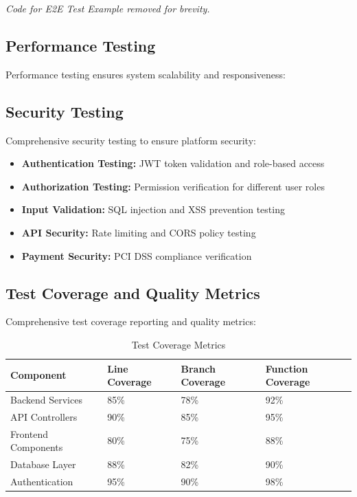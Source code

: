 \documentclass[conference]{IEEEtran}
\begin{document}
\textit{Code for E2E Test Example removed for brevity.}

\subsection{Performance Testing}
Performance testing ensures system scalability and responsiveness:

\subsection{Security Testing}
Comprehensive security testing to ensure platform security:

\begin{itemize}
    \item \textbf{Authentication Testing:} JWT token validation and role-based access
    \item \textbf{Authorization Testing:} Permission verification for different user roles
    \item \textbf{Input Validation:} SQL injection and XSS prevention testing
    \item \textbf{API Security:} Rate limiting and CORS policy testing
    \item \textbf{Payment Security:} PCI DSS compliance verification
\end{itemize}

\subsection{Test Coverage and Quality Metrics}
Comprehensive test coverage reporting and quality metrics:

\begin{table}[ht]
\centering
\caption{Test Coverage Metrics}
\begin{tabular}{|l|l|l|l|}
\hline
\textbf{Component} & \textbf{Line Coverage} & \textbf{Branch Coverage} & \textbf{Function Coverage} \\
\hline
Backend Services & 85\% & 78\% & 92\% \\
\hline
API Controllers & 90\% & 85\% & 95\% \\
\hline
Frontend Components & 80\% & 75\% & 88\% \\
\hline
Database Layer & 88\% & 82\% & 90\% \\
\hline
Authentication & 95\% & 90\% & 98\% \\
\hline
\end{tabular}
\end{table}
\end{document}
